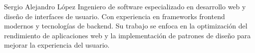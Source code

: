 \documentclass[journal]{IEEEtran}
\begin{document}
\begin{IEEEbiographynophoto}{Sergio Alejandro López}
  Ingeniero de software especializado en desarrollo web y diseño de interfaces de usuario. Con experiencia en frameworks frontend modernos y tecnologías de backend. Su trabajo se enfoca en la optimización del rendimiento de aplicaciones web y la implementación de patrones de diseño para mejorar la experiencia del usuario.
\end{IEEEbiographynophoto}




\end{document}
